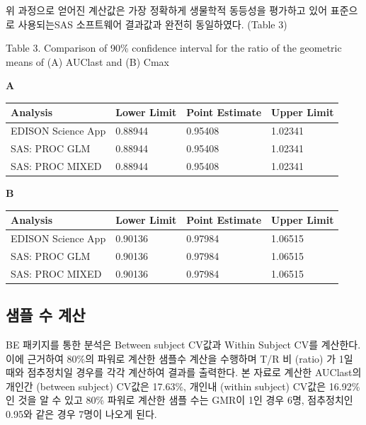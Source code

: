 \documentclass[
  10pt,
]{krantz}
\makeatletter
\newenvironment{Shaded}{\begin{snugshade}}{\end{snugshade}}
\newcommand{\DataTypeTok}[1]{\textcolor[rgb]{0.13,0.29,0.53}{#1}}
\newcommand{\KeywordTok}[1]{\textcolor[rgb]{0.13,0.29,0.53}{\textbf{#1}}}
\newcommand{\NormalTok}[1]{#1}
\newcommand{\OperatorTok}[1]{\textcolor[rgb]{0.81,0.36,0.00}{\textbf{#1}}}
\newcommand{\StringTok}[1]{\textcolor[rgb]{0.31,0.60,0.02}{#1}}
\newenvironment{kframe}{%
\medskip{}
\setlength{\fboxsep}{.8em}
 \def\at@end@of@kframe{}%
 \ifinner\ifhmode%
  \def\at@end@of@kframe{\end{minipage}}%
  \begin{minipage}{\columnwidth}%
 \fi\fi%
 \def\FrameCommand##1{\hskip\@totalleftmargin \hskip-\fboxsep
 \colorbox{shadecolor}{##1}\hskip-\fboxsep
     \hskip-\linewidth \hskip-\@totalleftmargin \hskip\columnwidth}%
 \MakeFramed {\advance\hsize-\width
   \@totalleftmargin\z@ \linewidth\hsize
   \@setminipage}}%
 {\par\unskip\endMakeFramed%
 \at@end@of@kframe}
\renewenvironment{Shaded}{\begin{kframe}}{\end{kframe}}
\makeatother
\begin{document}
위 과정으로 얻어진 계산값은 가장 정확하게 생물학적 동등성을 평가하고 있어 표준으로 사용되는SAS 소프트웨어 결과값과 완전히 동일하였다. (Table 3)

Table 3. Comparison of 90\% confidence interval for the ratio of the geometric means of (A) AUClast and (B) Cmax

\textbf{A}

\begin{longtable}[]{@{}llll@{}}
\toprule
Analysis & Lower Limit & Point Estimate & Upper Limit\tabularnewline
\midrule
\endhead
EDISON Science App & 0.88944 & 0.95408 & 1.02341\tabularnewline
SAS: PROC GLM & 0.88944 & 0.95408 & 1.02341\tabularnewline
SAS: PROC MIXED & 0.88944 & 0.95408 & 1.02341\tabularnewline
\bottomrule
\end{longtable}

\textbf{B}

\begin{longtable}[]{@{}llll@{}}
\toprule
Analysis & Lower Limit & Point Estimate & Upper Limit\tabularnewline
\midrule
\endhead
EDISON Science App & 0.90136 & 0.97984 & 1.06515\tabularnewline
SAS: PROC GLM & 0.90136 & 0.97984 & 1.06515\tabularnewline
SAS: PROC MIXED & 0.90136 & 0.97984 & 1.06515\tabularnewline
\bottomrule
\end{longtable}

\hypertarget{uxc0d8uxd50c-uxc218-uxacc4uxc0b0}{%
\subsection{샘플 수 계산}\label{uxc0d8uxd50c-uxc218-uxacc4uxc0b0}}

BE 패키지를 통한 분석은 Between subject CV값과 Within Subject CV를 계산한다. 이에 근거하여 80\%의 파워로 계산한 샘플수 계산을 수행하며 T/R 비 (ratio) 가 1일 때와 점추정치일 경우를 각각 계산하여 결과를 출력한다.
본 자료로 계산한 AUClast의 개인간 (between subject) CV값은 17.63\%, 개인내 (within subject) CV값은 16.92\%인 것을 알 수 있고 80\% 파워로 계산한 샘플 수는 GMR이 1인 경우 6명, 점추정치인 0.95와 같은 경우 7명이 나오게 된다.

\begin{Shaded}
\end{Shaded}
\end{document}
